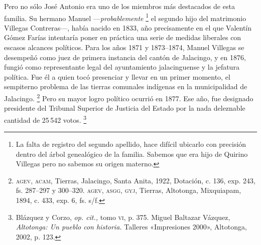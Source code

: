 \documentclass[14pt,twoside,final]{extbook} %
\let\oldfootnote\footnote
\renewcommand\footnote[1]{%
\oldfootnote{\hspace{1mm}#1}}
\begin{document}
Pero no sólo José Antonio era uno de los miembros más destacados de esta familia. Su hermano Manuel ---\emph{probablemente}\footnote{La falta de registro del segundo apellido, hace difícil ubicarlo con precisión dentro del árbol genealógico de la familia. Sabemos que era hijo de Quirino Villegas\index[nombres]{Villegas, Quirino} pero no sabemos su origen materno.} el segundo hijo del matrimonio Villegas Contreras---, había nacido en 1833, año precisamente en el que Valentín Gómez Farías intentaría poner en práctica una serie de medidas liberales con escasos alcances políticos. Para los años 1871 y 1873--1874, Manuel Villegas se desempeñó como juez de primera instancia del cantón de Jalacingo, y en 1876, fungió como representante legal del ayuntamiento jalacinguense y la jefatura política. Fue él a quien tocó presenciar y llevar en un primer momento, el sempiterno problema de las tierras comunales indígenas en la municipalidad de Jalacingo.\footnote{\textsc{agev, acam}, Tierras, Jalacingo, Santa Anita, 1922, Dotación, c. 136, exp. 243, fs. 287--297 y 300--320. \textsc{agev, asgg, gyj}, Tierras, Altotonga, Mixquiapam, 1894, c. 433, exp. 6, fs. s/f.} Pero su mayor logro político ocurrió en 1877. Ese año, fue designado presidente del Tribunal Superior de Justicia del Estado por la nada deleznable cantidad de 25\,542 votos.\footnote{Blázquez y Corzo, \emph{op. cit.,} tomo \textsc{vi}, p. 375. Miguel Baltazar Vázquez, \emph{Altotonga: Un pueblo con historia.} Talleres «Impresiones 2000», Altotonga, 2002, p. 123.}
\end{document}
